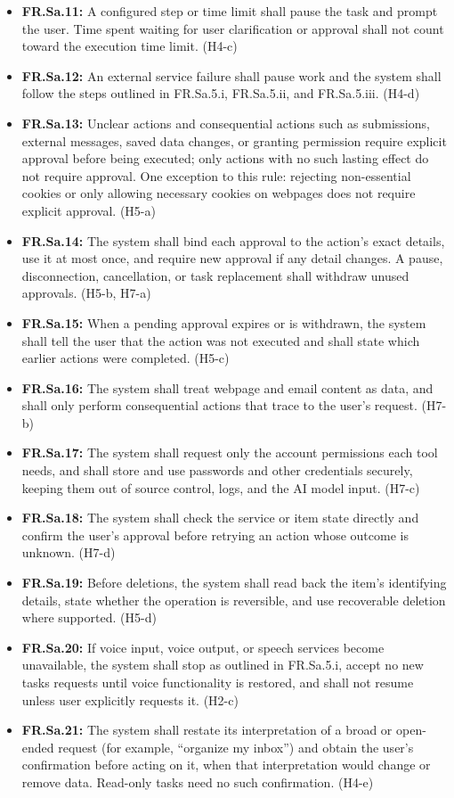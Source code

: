 \documentclass{article}
\begin{document}
\begin{itemize}
  \item \textbf{FR.Sa.11:} A configured step or time limit shall pause the task and prompt the user. Time spent waiting for user clarification or approval shall not count toward the execution time limit. (H4-c)
  \item \textbf{FR.Sa.12:} An external service failure shall pause work and the system shall follow the steps outlined in FR.Sa.5.i, FR.Sa.5.ii, and FR.Sa.5.iii. (H4-d)
  \item \textbf{FR.Sa.13:} Unclear actions and consequential actions such as submissions, external messages, saved data changes, or granting permission require explicit approval before being executed; only actions with no such lasting effect do not require approval. One exception to this rule: rejecting non-essential cookies or only allowing necessary cookies on webpages does not require explicit approval. (H5-a)
  \item \textbf{FR.Sa.14:} The system shall bind each approval to the action's exact details, use it at most once, and require new approval if any detail changes. A pause, disconnection, cancellation, or task replacement shall withdraw unused approvals. (H5-b, H7-a)
  \item \textbf{FR.Sa.15:} When a pending approval expires or is withdrawn, the system shall tell the user that the action was not executed and shall state which earlier actions were completed. (H5-c)
  \item \textbf{FR.Sa.16:} The system shall treat webpage and email content as data, and shall only perform consequential actions that trace to the user's request. (H7-b)
  \item \textbf{FR.Sa.17:} The system shall request only the account permissions each tool needs, and shall store and use passwords and other credentials securely, keeping them out of source control, logs, and the AI model input. (H7-c)
  \item \textbf{FR.Sa.18:} The system shall check the service or item state directly and confirm the user's approval before retrying an action whose outcome is unknown. (H7-d)
  \item \textbf{FR.Sa.19:} Before deletions, the system shall read back the item's identifying details, state whether the operation is reversible, and use recoverable deletion where supported. (H5-d)
  \item \textbf{FR.Sa.20:} If voice input, voice output, or speech services become unavailable, the system shall stop as outlined in FR.Sa.5.i, accept no new tasks requests until voice functionality is restored, and shall not resume unless user explicitly requests it. (H2-c)
  \item \textbf{FR.Sa.21:} The system shall restate its interpretation of a broad or open-ended request (for example, ``organize my inbox'') and obtain the user's confirmation before acting on it, when that interpretation would change or remove data. Read-only tasks need no such confirmation. (H4-e)
\end{itemize}
\end{document}
